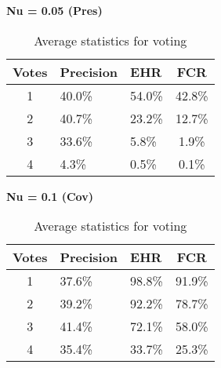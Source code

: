 \begin{table}[H]
  \centering
  \textbf{Nu = 0.05 (Pres)}\vspace{2pt}
  \begin{tabularx}{\columnwidth}{cXXc}
    \toprule
    \textbf{Votes} & \textbf{Precision} & \textbf{EHR} & \textbf{FCR} \\
    \midrule
    1 & 40.0\% & 54.0\% & 42.8\% \\ \hline
    2 & 40.7\% & 23.2\% & 12.7\% \\ \hline
    3 & 33.6\% & 5.8\% & 1.9\% \\ \hline
    4 & 4.3\% & 0.5\% & 0.1\% \\ \hline
    \bottomrule
  \end{tabularx}

  \vspace{4pt}

  \textbf{Nu = 0.1 (Cov)}\vspace{2pt}
  \begin{tabularx}{\columnwidth}{cXXc}
    \toprule
    \textbf{Votes} & \textbf{Precision} & \textbf{EHR} & \textbf{FCR} \\
    \midrule
    1 & 37.6\% & 98.8\% & 91.9\% \\ \hline
    2 & 39.2\% & 92.2\% & 78.7\% \\ \hline
    3 & 41.4\% & 72.1\% & 58.0\% \\ \hline
    4 & 35.4\% & 33.7\% & 25.3\% \\ \hline
    \bottomrule
  \end{tabularx}

  \caption{Average statistics for voting}
  \label{[TABLE] avg_stats_voting}
\end{table}